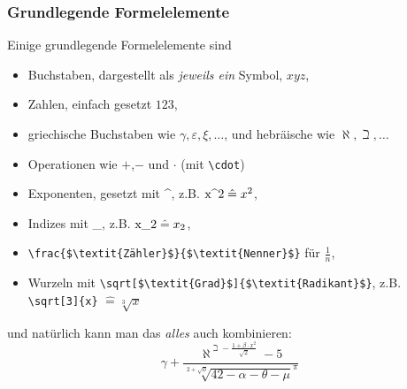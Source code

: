 \begin{frame}[fragile]
  \frametitle{Grundlegende Formelelemente}

  \onslide<+->

  Einige grundlegende Formelelemente sind
  \begin{itemize}
  \item Buchstaben, dargestellt als \textit{jeweils ein} Symbol, $xyz$,
  \item Zahlen, einfach gesetzt $123$,
  \item griechische Buchstaben wie $\gamma, \varepsilon, \xi, \ldots$, und hebräische wie
    $\aleph, \beth, \ldots$
  \item Operationen wie $+$,$-$ und $\cdot$ (mit \lstinline!\cdot!)
  \item Exponenten, gesetzt mit \textasciicircum, z.B. $\text{\lstinline!x^2!}
    \mathrel{\hat=} x^2$,
  \item Indizes mit \_, z.B. $\text{\lstinline!x_2!} \mathrel{\hat=} x_2$,
  \item \lstinline!\frac{$\textit{Zähler}$}{$\textit{Nenner}$}! für $\frac{1}{n}$,
  \item Wurzeln mit \lstinline!\sqrt[$\textit{Grad}$]{$\textit{Radikant}$}!, z.B.
    \lstinline!\sqrt[3]{x}! ${} \mathrel{\hat=} \sqrt[3]{x}$
  \end{itemize}

  \onslide<+->

  und natürlich kann man das \textit{alles} auch kombinieren:
  \begin{equation*}
    \gamma + \frac{\aleph^{\beth - \frac{1+\beta\cdot x^2}{\sqrt{2}}}-5}{\sqrt[2+\sqrt{\phi}]
      {42-\alpha-\theta-\mu}^\pi}
  \end{equation*}

\end{frame}

